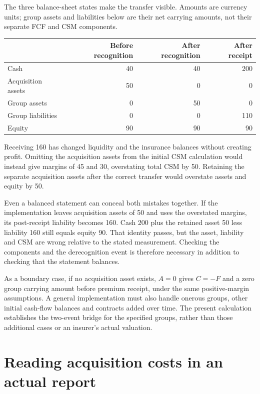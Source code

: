 \clearpage
The three balance-sheet states make the transfer visible. Amounts are
currency units; group assets and liabilities below are their net carrying
amounts, not their separate FCF and CSM components.
\begin{center}
\begin{tabular}{lrrr}
\toprule
 & Before recognition & After recognition & After receipt \\
\midrule
Cash & 40 & 40 & 200 \\
Acquisition assets & 50 & 0 & 0 \\
Group assets & 0 & 50 & 0 \\
Group liabilities & 0 & 0 & 110 \\
Equity & 90 & 90 & 90 \\
\bottomrule
\end{tabular}
\end{center}
Receiving 160 has changed liquidity and the insurance balances without
creating profit. Omitting the acquisition assets from the initial CSM
calculation would instead give margins of 45 and 30, overstating total CSM
by 50. Retaining the separate acquisition assets after the correct transfer
would overstate assets and equity by 50.

Even a balanced statement can conceal both mistakes together. If the
implementation leaves acquisition assets of 50 and uses the overstated
margins, its post-receipt liability becomes 160. Cash 200 plus the retained
asset 50 less liability 160 still equals equity 90. That identity passes,
but the asset, liability and CSM are wrong relative to the stated measurement.
Checking the components and the derecognition event is therefore necessary
in addition to checking that the statement balances.

As a boundary case, if no acquisition asset exists, $A=0$ gives $C=-F$ and
a zero group carrying amount before premium receipt, under the same
positive-margin assumptions. A general implementation must also handle
onerous groups, other initial cash-flow balances and contracts added over
time. The present calculation establishes the two-event bridge for the
specified groups, rather than those additional cases or an insurer's actual
valuation.

\clearpage
\section{Reading acquisition costs in an actual report}
\label{sec:munich-new-contracts}

